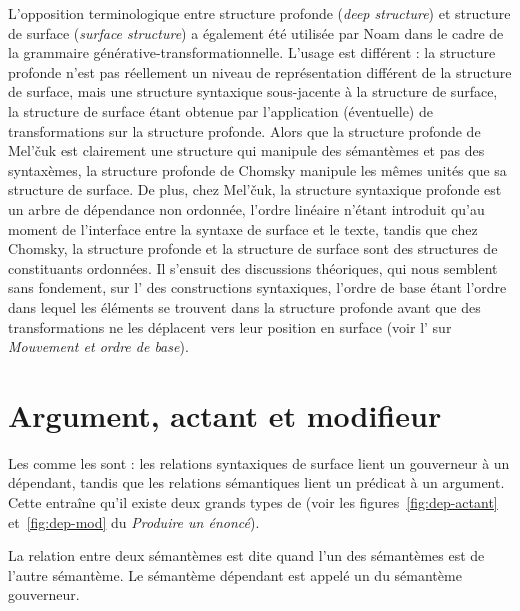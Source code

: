 {L’opposition terminologique entre structure profonde (\textit{deep structure}) et structure de surface (\textit{surface structure}) a également été utilisée par Noam  \citet{chomsky1965aspects} dans le cadre de la grammaire générative-transformationnelle. L’usage est différent : la structure profonde n’est pas réellement un niveau de représentation différent de la structure de surface, mais une structure syntaxique sous-jacente à la structure de surface, la structure de surface étant obtenue par l’application (éventuelle) de transformations sur la structure profonde. Alors que la structure profonde de Mel’čuk est clairement une structure qui manipule des sémantèmes et pas des syntaxèmes, la structure profonde de Chomsky manipule les mêmes unités que sa structure de surface. De plus, chez Mel’čuk, la structure syntaxique profonde est un arbre de dépendance non ordonnée, l’ordre linéaire n’étant introduit qu’au moment de l’interface entre la syntaxe de surface et le texte, tandis que chez Chomsky, la structure profonde et la structure de surface sont des structures de constituants ordonnées. Il s’ensuit des discussions théoriques, qui nous semblent sans fondement, sur l’ des constructions syntaxiques, l’ordre de base étant l’ordre dans lequel les éléments se trouvent dans la structure profonde avant que des transformations ne les déplacent vers leur position en surface (voir l’ sur \textit{Mouvement et ordre de base}).}

\section{Argument, actant et modifieur}\label{sec:13-actant}\largerpage
Les  comme les  sont  : les relations syntaxiques de surface lient un gouverneur à un dépendant, tandis que les relations sémantiques lient un prédicat à un argument. Cette  entraîne qu’il existe deux grands types de  (voir les figures~\ref{fig:dep-actant} et~\ref{fig:dep-mod} du  \textit{Produire un énoncé}).

{La relation entre deux sémantèmes est dite  quand l’un des sémantèmes est  de l’autre sémantème. Le sémantème dépendant est appelé un  du sémantème gouverneur.}

